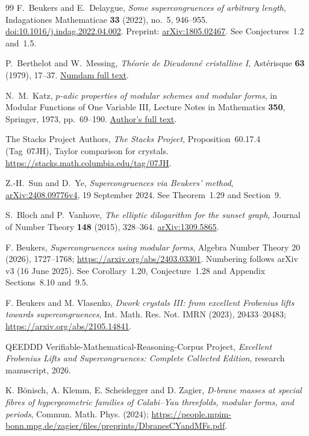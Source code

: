 \documentclass[11pt,letterpaper]{article}
\theoremstyle{definition}
\theoremstyle{remark}
\begin{document}
\begin{thebibliography}{99}
F.~Beukers and E.~Delaygue,
\emph{Some supercongruences of arbitrary length},
Indagationes Mathematicae \textbf{33} (2022), no.~5, 946--955.
\href{https://doi.org/10.1016/j.indag.2022.04.002}{doi:10.1016/j.indag.2022.04.002}.
Preprint: \href{https://arxiv.org/abs/1805.02467}{arXiv:1805.02467}. See Conjectures~1.2 and~1.5.

P.~Berthelot and W.~Messing,
\emph{Th\'eorie de Dieudonn\'e cristalline I},
Ast\'erisque \textbf{63} (1979), 17--37.
\href{https://numdam.org/item/AST_1979__63__17_0/}{Numdam full text}.

N.~M.~Katz, \emph{$p$-adic properties of modular schemes and modular forms},
in Modular Functions of One Variable III,
Lecture Notes in Mathematics \textbf{350}, Springer, 1973, pp.~69--190.
\href{https://web.math.princeton.edu/~nmk/old/padicpropMFMS.pdf}{Author's full text}.

The Stacks Project Authors, \emph{The Stacks Project},
Proposition~60.17.4 (Tag~07JH), Taylor comparison for crystals.
\url{https://stacks.math.columbia.edu/tag/07JH}.

Z.-H.~Sun and D.~Ye, \emph{Supercongruences via Beukers' method},
\href{https://arxiv.org/abs/2408.09776v4}{arXiv:2408.09776v4},
19 September 2024. See Theorem~1.29 and Section~9.

S.~Bloch and P.~Vanhove, \emph{The elliptic dilogarithm for the sunset graph},
Journal of Number Theory \textbf{148} (2015), 328--364.
\href{https://arxiv.org/abs/1309.5865}{arXiv:1309.5865}.

F. Beukers,
\emph{Supercongruences using modular forms},
Algebra Number Theory 20 (2026), 1727--1768;
\url{https://arxiv.org/abs/2403.03301}. Numbering follows arXiv v3 (16 June 2025). See Corollary~1.20, Conjecture~1.28 and Appendix Sections~8.10 and~9.5.

F. Beukers and M. Vlasenko,
\emph{Dwork crystals III: from excellent Frobenius lifts towards supercongruences},
Int. Math. Res. Not. IMRN (2023), 20433--20483;
\url{https://arxiv.org/abs/2105.14841}.

QEEDDD Verifiable-Mathematical-Reasoning-Corpus Project,
\emph{Excellent Frobenius Lifts and Supercongruences: Complete Collected Edition},
research manuscript, 2026.

K. B\"onisch, A. Klemm, E. Scheidegger and D. Zagier,
\emph{D-brane masses at special fibres of hypergeometric families of Calabi--Yau threefolds,
modular forms, and periods},
Commun. Math. Phys. (2024);
\url{https://people.mpim-bonn.mpg.de/zagier/files/preprints/DbranesCYandMFs.pdf}.


\end{thebibliography}
\end{document}
